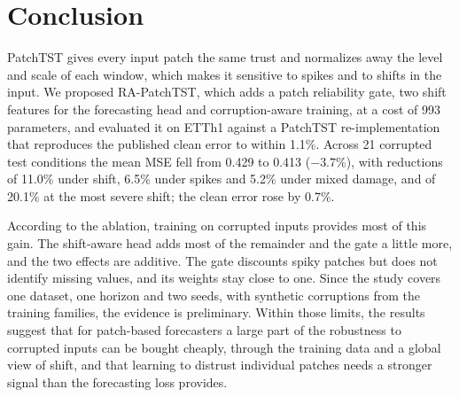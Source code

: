\section{Conclusion}
\label{sec:conclusion}

PatchTST gives every input patch the same trust and normalizes away the level and scale of each window, which makes it sensitive to spikes and to shifts in the input. We proposed RA-PatchTST, which adds a patch reliability gate, two shift features for the forecasting head and corruption-aware training, at a cost of 993 parameters, and evaluated it on ETTh1 against a PatchTST re-implementation that reproduces the published clean error to within 1.1\%. Across 21 corrupted test conditions the mean MSE fell from 0.429 to 0.413 ($-3.7\%$), with reductions of 11.0\% under shift, 6.5\% under spikes and 5.2\% under mixed damage, and of 20.1\% at the most severe shift; the clean error rose by 0.7\%.

According to the ablation, training on corrupted inputs provides most of this gain. The shift-aware head adds most of the remainder and the gate a little more, and the two effects are additive. The gate discounts spiky patches but does not identify missing values, and its weights stay close to one. Since the study covers one dataset, one horizon and two seeds, with synthetic corruptions from the training families, the evidence is preliminary. Within those limits, the results suggest that for patch-based forecasters a large part of the robustness to corrupted inputs can be bought cheaply, through the training data and a global view of shift, and that learning to distrust individual patches needs a stronger signal than the forecasting loss provides.
